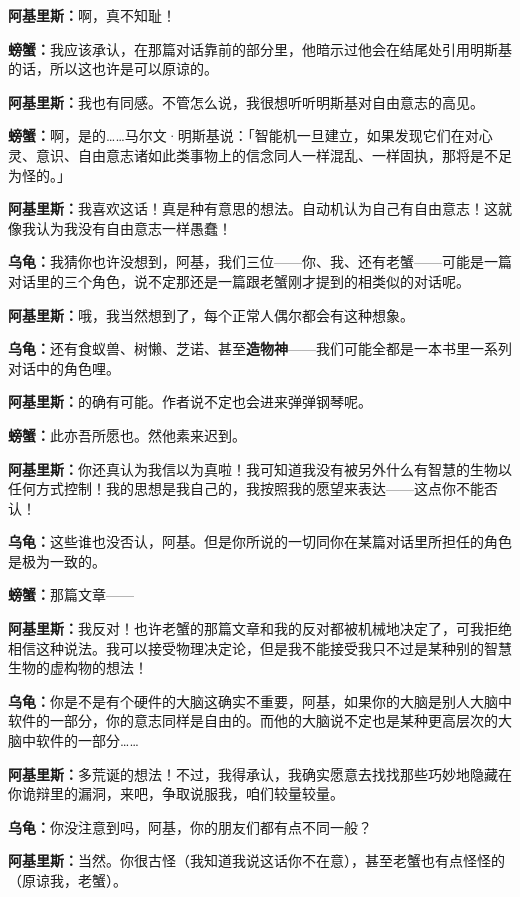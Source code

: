\documentclass[
  12pt,
  twoside,
  openright,
  oldfontcommands,
]{memoir}
\newcommand{\heititext}[1]{{\heifamily\bfseries #1}}
\newcommand{\dialogname}[1]{{\heifamily\bfseries #1}}
\begin{document}
\dialogname{阿基里斯：}啊，真不知耻！

\dialogname{螃蟹：}我应该承认，在那篇对话靠前的部分里，他暗示过他会在结尾处引用明斯基的话，所以这也许是可以原谅的。

\dialogname{阿基里斯：}我也有同感。不管怎么说，我很想听听明斯基对自由意志的高见。

\dialogname{螃蟹：}啊，是的\ldots\ldots 马尔文·明斯基说：「智能机一旦建立，如果发现它们在对心灵、意识、自由意志诸如此类事物上的信念同人一样混乱、一样固执，那将是不足为怪的。」

\dialogname{阿基里斯：}我喜欢这话！真是种有意思的想法。自动机认为自己有自由意志！这就像我认为我没有自由意志一样愚蠢！

\dialogname{乌龟：}我猜你也许没想到，阿基，我们三位------你、我、还有老蟹------可能是一篇对话里的三个角色，说不定那还是一篇跟老蟹刚才提到的相类似的对话呢。

\dialogname{阿基里斯：}哦，我当然想到了，每个正常人偶尔都会有这种想象。

\dialogname{乌龟：}还有食蚁兽、树懒、芝诺、甚至\heititext{造物神}------我们可能全都是一本书里一系列对话中的角色哩。

\dialogname{阿基里斯：}的确有可能。作者说不定也会进来弹弹钢琴呢。

\dialogname{螃蟹：}此亦吾所愿也。然他素来迟到。

\dialogname{阿基里斯：}你还真认为我信以为真啦！我可知道我没有被另外什么有智慧的生物以任何方式控制！我的思想是我自己的，我按照我的愿望来表达------这点你不能否认！

\dialogname{乌龟：}这些谁也没否认，阿基。但是你所说的一切同你在某篇对话里所担任的角色是极为一致的。

\dialogname{螃蟹：}那篇文章------

\dialogname{阿基里斯：}我反对！也许老蟹的那篇文章和我的反对都被机械地决定了，可我拒绝相信这种说法。我可以接受物理决定论，但是我不能接受我只不过是某种别的智慧生物的虚构物的想法！

\dialogname{乌龟：}你是不是有个硬件的大脑这确实不重要，阿基，如果你的大脑是别人大脑中软件的一部分，你的意志同样是自由的。而他的大脑说不定也是某种更高层次的大脑中软件的一部分\ldots\ldots{}

\dialogname{阿基里斯：}多荒诞的想法！不过，我得承认，我确实愿意去找找那些巧妙地隐藏在你诡辩里的漏洞，来吧，争取说服我，咱们较量较量。

\dialogname{乌龟：}你没注意到吗，阿基，你的朋友们都有点不同一般？

\dialogname{阿基里斯：}当然。你很古怪（我知道我说这话你不在意），甚至老蟹也有点怪怪的（原谅我，老蟹）。
\end{document}
